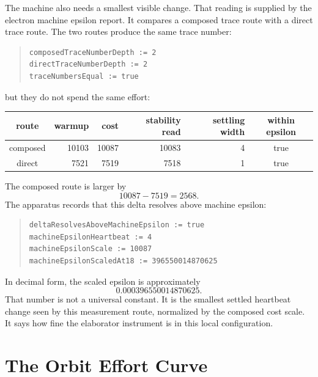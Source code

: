 The machine also needs a smallest visible change. That reading is supplied by the electron machine epsilon
report. It compares a composed trace route with a direct trace route. The two routes produce the same trace
number:
\begin{quote}\small
\begin{verbatim}
composedTraceNumberDepth := 2
directTraceNumberDepth := 2
traceNumbersEqual := true
\end{verbatim}
\end{quote}
but they do not spend the same effort:
\begin{center}\small
\begin{tabular}{c|r|r|r|r|c}
route & warmup & cost & stability read & settling width & within epsilon\\
\hline
composed & 10103 & 10087 & 10083 & 4 & true\\
direct & 7521 & 7519 & 7518 & 1 & true
\end{tabular}
\end{center}
The composed route is larger by
\[
  10087 - 7519 = 2568.
\]
The apparatus records that this delta resolves above machine epsilon:
\begin{quote}\small
\begin{verbatim}
deltaResolvesAboveMachineEpsilon := true
machineEpsilonHeartbeat := 4
machineEpsilonScale := 10087
machineEpsilonScaledAt18 := 396550014870625
\end{verbatim}
\end{quote}
In decimal form, the scaled epsilon is approximately
\[
  0.000396550014870625.
\]
That number is not a universal constant. It is the smallest settled heartbeat change seen by this measurement
route, normalized by the composed cost scale. It says how fine the elaborator instrument is in this local
configuration.

\section{The Orbit Effort Curve}

